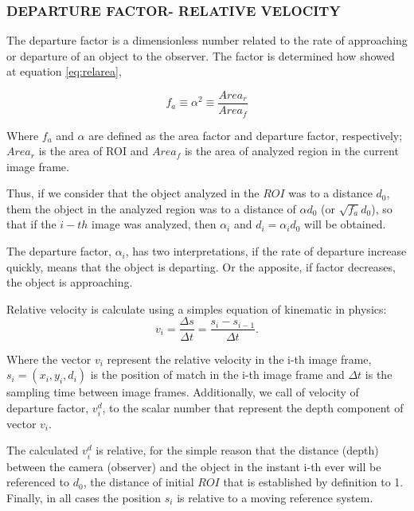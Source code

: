 
\subsubsection{DEPARTURE FACTOR- RELATIVE VELOCITY}
The departure factor is a dimensionless number related to the rate of approaching 
or departure of an object to the observer. The factor
is determined how showed at equation \ref{eq:relarea},

\begin{equation}\label{eq:relarea}
f_a \equiv \alpha^2 \equiv \frac{Area_r}{Area_f} 
\end{equation}

Where $f_a$ and $\alpha$ are defined as the area factor and departure factor, 
respectively; $Area_r$ is the area of ROI and $Area_f$ 
is the area of analyzed region in the current image frame. 

Thus, if we consider that the object analyzed in the $ROI$ was to a distance $d_0$,
them the object in the analyzed region was to a distance of $\alpha d_0$ (or $\sqrt{f_a} d_0$),
so that if the $i-th$ image was analyzed, then $\alpha_i$ and $d_i=\alpha_i d_0$ will be obtained.

The departure factor, $\alpha_i$, has two interpretations, if the rate of departure increase quickly, 
means that the object is departing. Or the apposite, if factor decreases, the 
object is approaching.

Relative velocity is calculate using a simples equation of kinematic in physics:
\begin{equation}
 v_i = \frac{\Delta s}{\Delta t}= \frac{s_i-s_{i-1}}{\Delta t}.
\end{equation}

Where the vector $v_i$ represent the relative velocity in the i-th image frame, 
$s_i=(x_i,y_i,d_i)$ is the position of match in the i-th image frame
and $\Delta t$ is the sampling time between image frames.
Additionally, we call of velocity of departure factor, $v^d_i$, 
to the scalar number that represent the depth component
of vector $v_i$.

The calculated  $v^d_i$  is relative, for the simple reason that the distance (depth) between the 
camera (observer) and the object in the instant i-th ever will be referenced to $d_0$, the distance of
initial $ROI$ that is established by definition to 1.
Finally, in all cases the position $s_i$ is relative to a moving reference system.

